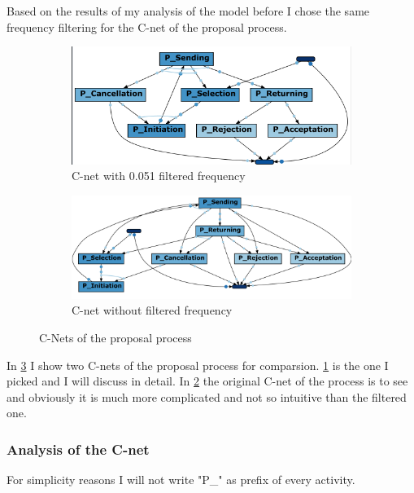 Based on the results of my analysis of the model before I chose the same frequency filtering for the C-net of the proposal process.
\begin{figure}[!htbp]
\centering
\begin{subfigure}{0.8\textwidth}
\includegraphics[height = 0.2\textheight]{PCnet0-05.PNG}
\caption{C-net with 0.051 filtered frequency}
\label{fig:cnetP0-025}
\end{subfigure}
\begin{subfigure}{0.8\textwidth}
\includegraphics[height = 0.2\textheight]{PropC-Net0.PNG}
\caption{C-net without filtered frequency}
\label{fig:cnetP0}
\end{subfigure}
\caption{C-Nets of the proposal process}
\label{fig:cNetP}
\end{figure}

In \ref{fig:cNetP} I show two C-nets of the proposal process for comparsion. \ref{fig:cnetP0-025} is the one I picked and I will discuss in detail. In \ref{fig:cnetP0} the original C-net of the process is to see and obviously it is much more complicated and not so intuitive than the filtered one. 

\subsubsection{Analysis of the C-net}
For simplicity reasons I will not write "P\_" as prefix of every activity.

